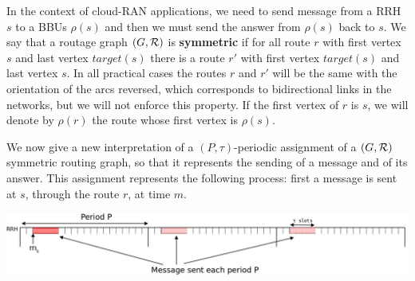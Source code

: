 \documentclass[a4paper,10pt]{article}
\begin{document}
% 

      
      In the context of cloud-RAN applications, we need to send message from a RRH $s$ to a BBUs $\rho(s)$ and then 
      we must send the answer from $\rho(s)$ back to $s$. We say that a routage graph $(G, {\cal R})$ is \textbf{symmetric}
      if for all route $r$ with first vertex $s$ and last vertex $target(s)$ there is a route $r'$ with first vertex $target(s)$
      and last vertex $s$. In all practical cases the routes $r$ and $r'$ will be the same with the orientation of the arcs reversed, which corresponds to bidirectional links in the networks, but we will not enforce this property.
      If the first vertex of $r$ is $s$, we will denote by $\rho(r)$ the route whose first vertex is $\rho(s)$.
         
         We now give a new interpretation of a $(P,\tau)$-periodic assignment of a $(G,{\cal R})$ symmetric routing graph, so that it represents the sending of a message and of its answer.
	This assignment represents the following process: first a message is sent at $s$, through the route $r$, at time $m$.
      
%       
      
      
      \begin{center}
      \includegraphics[scale=0.3]{rrh.png}
      \end{center}
      
\end{document}
